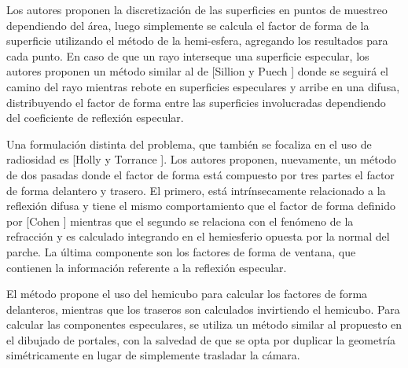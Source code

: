 Los autores proponen la discretización de las superficies en puntos de muestreo dependiendo del área, luego simplemente se calcula el factor de forma de la superficie utilizando el método de la hemi-esfera, agregando los resultados para cada punto. En caso de que un rayo interseque una superficie especular, los autores proponen un método similar al de [Sillion y Puech \cite{Sillion}] donde se seguirá el camino del rayo mientras rebote en superficies especulares y arribe en una difusa, distribuyendo el factor de forma entre las superficies involucradas dependiendo del coeficiente de reflexión especular.

Una formulación distinta del problema, que también se focaliza en el uso de radiosidad es [Holly y Torrance \cite{Holly}]. Los autores proponen, nuevamente, un método de dos pasadas donde el factor de forma está compuesto por tres partes el factor de forma delantero y trasero. El primero, está intrínsecamente relacionado a la reflexión difusa y tiene el mismo comportamiento que el factor de forma definido por [Cohen \cite{Cohen}] mientras que el segundo se relaciona con el fenómeno de la refracción y es calculado integrando en el hemiesferio opuesta por la normal del parche. La última componente son los factores de forma de ventana, que contienen la información referente a la reflexión especular.

El método propone el uso del hemicubo para calcular los factores de forma delanteros, mientras que los traseros son calculados invirtiendo el hemicubo. Para calcular las componentes especulares, se utiliza un método similar al propuesto en el dibujado de portales, con la salvedad de que se opta por duplicar la geometría simétricamente en lugar de simplemente trasladar la cámara.